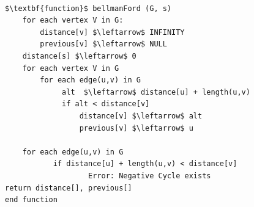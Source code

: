 \noindent \\
\begin{minipage}{1.0\textwidth} \small
\begin{lstlisting}[label=lst:Bellman-Ford]
$\textbf{function}$ bellmanFord (G, s)
	for each vertex V in G:
		distance[v] $\leftarrow$ INFINITY
		previous[v] $\leftarrow$ NULL
	distance[s] $\leftarrow$ 0
	for each vertex V in G
	    for each edge(u,v) in G
	         alt  $\leftarrow$ distance[u] + length(u,v)
	         if alt < distance[v]
	             distance[v] $\leftarrow$ alt
	             previous[v] $\leftarrow$ u
	 
	for each edge(u,v) in G
	       if distance[u] + length(u,v) < distance[v]
	               Error: Negative Cycle exists
return distance[], previous[]
end function
       
\end{lstlisting}
\label{lst:Bellman-Ford Pseudo-code}
\end{minipage}







